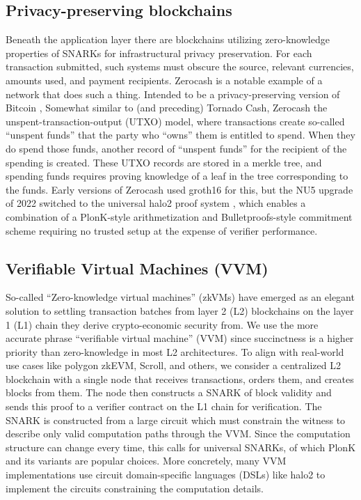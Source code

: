 \subsection{Privacy-preserving blockchains}
\noindent Beneath the application layer there are blockchains utilizing zero-knowledge properties of SNARKs for infrastructural privacy preservation. For each transaction submitted, such systems must obscure the source, relevant currencies, amounts used, and payment recipients. Zerocash \cite{zcash} is a notable example of a network that does such a thing. Intended to be a privacy-preserving version of Bitcoin \cite{bitcoin}, Somewhat similar to (and preceding) Tornado Cash, Zerocash the unspent-transaction-output (UTXO) model, where transactions create so-called ``unspent funds'' that the party who ``owns'' them is entitled to spend. When they do spend those funds, another record of ``unspent funds'' for the recipient of the spending is created. These UTXO records are stored in a merkle tree, and spending funds requires proving knowledge of a leaf in the tree corresponding to the funds. Early versions of Zerocash used groth16 for this, but the NU5 upgrade of 2022 switched to the universal halo2 proof system \cite{halo2}, which enables a combination of a PlonK-style arithmetization and Bulletproofs-style commitment scheme \cite{bulletproofs} requiring no trusted setup at the expense of verifier performance.

\subsection{Verifiable Virtual Machines (VVM)}
\noindent So-called ``Zero-knowledge virtual machines'' (zkVMs) have emerged as an elegant solution to settling transaction batches from layer 2 (L2) blockchains on the layer 1 (L1) chain they derive crypto-economic security from. We use the more accurate phrase ``verifiable virtual machine'' (VVM) since succinctness is a higher priority than zero-knowledge in most L2 architectures. To align with real-world use cases like polygon zkEVM, Scroll, and others, we consider a centralized L2 blockchain with a single node that receives transactions, orders them, and creates blocks from them. The node then constructs a SNARK of block validity and sends this proof to a verifier contract on the L1 chain for verification. The SNARK is constructed from a large circuit which must constrain the witness to describe only valid computation paths through the VVM. Since the computation structure can change every time, this calls for universal SNARKs, of which PlonK and its variants are popular choices. More concretely, many VVM implementations use circuit domain-specific languages (DSLs) like halo2 to implement the circuits constraining the computation details.\\

